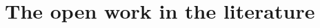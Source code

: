     \section{The open work in the literature}

        
            
            
            
           

